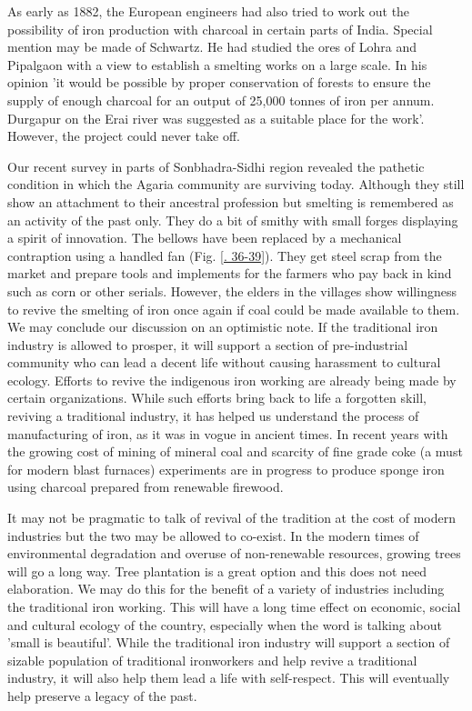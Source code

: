 As early as 1882, the European engineers had also tried to work out the possibility of iron production with charcoal in certain parts of India. Special mention may be made of Schwartz. He had studied the ores of Lohra and Pipalgaon with a view to establish a smelting works on a large scale. In his opinion 'it would be possible by proper conservation of forests to ensure the supply of enough charcoal for an output of 25,000 tonnes of iron per annum. Durgapur on the Erai river was suggested as a suitable place for the work'. However, the project could never take off. 

\newpage

Our recent survey in parts of Sonbhadra-Sidhi region revealed the pathetic condition in which the Agaria community are surviving today. Although they still show an attachment to their ancestral profession but smelting is remembered as an activity of the past only. They do a bit of smithy with small forges displaying a spirit of innovation. The bellows have been replaced by a mechanical contraption using a handled fan (Fig. \ref{. 36-39}). They get steel scrap from the market and prepare tools and implements for the farmers who pay back in kind such as corn or other serials. However, the elders in the villages show willingness to revive the smelting of iron once again if coal could be made available to them. We may conclude our discussion on an optimistic note. If the traditional iron industry is allowed to prosper, it will support a section of pre-industrial community who can lead a decent life without causing harassment to cultural ecology. Efforts to revive the indigenous iron working are already being made by certain organizations. While such efforts bring back to life a forgotten skill, reviving a traditional industry, it has helped us understand the process of manufacturing of iron, as it was in vogue in ancient times. In recent years with the growing cost of mining of mineral coal and scarcity of fine grade coke (a must for modern blast furnaces) experiments are in progress to produce sponge iron using charcoal prepared from renewable firewood. 

It may not be pragmatic to talk of revival of the tradition at the cost of modern industries but the two may be allowed to co-exist. In the modern times of environmental degradation and overuse of non-renewable resources, growing trees will go a long way. Tree plantation is a great option and this does not need elaboration. We may do this for the benefit of a variety of industries including the traditional iron working. This will have a long time effect on economic, social and cultural ecology of the country, especially when the word is talking about 'small is beautiful'. While the traditional iron industry will support a section of sizable population of traditional ironworkers and help revive a traditional industry, it will also help them lead a life with self-respect. This will eventually help preserve a legacy of the past.

